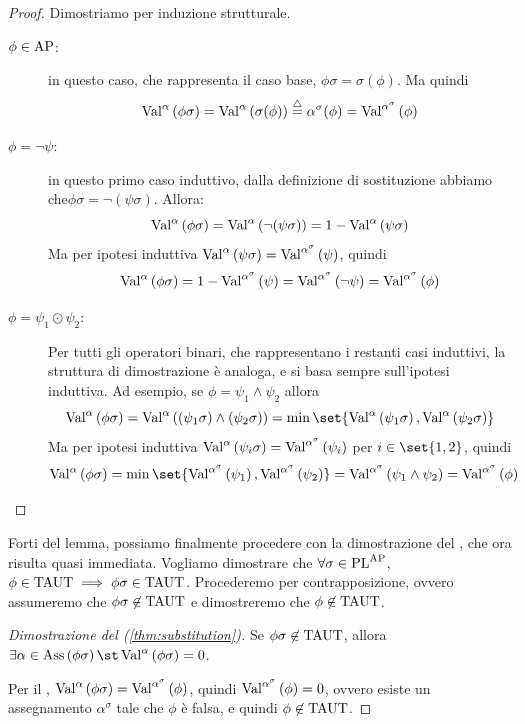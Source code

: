 \begin{proof}
  Dimostriamo per induzione strutturale.

  \begin{description}
    \item[\(\phi \in \AP\):] in questo caso, che rappresenta il caso base, \(\phi\sigma = \sigma(\phi)\). Ma quindi
      \[\Val{\alpha}[\phi\sigma] = \Val{\alpha}[\sigma(\phi)] \eqdef \alpha^\sigma(\phi) = \Val{\alpha^\sigma}[\phi]\]
    \item[\(\phi = \neg \psi\):] in questo primo caso induttivo, dalla definizione di sostituzione abbiamo che\(\phi\sigma = \neg (\psi\sigma)\). Allora:
      \[\Val{\alpha}[\phi\sigma] = \Val{\alpha}[\neg (\psi\sigma)] = 1 - \Val{\alpha}[\psi\sigma]\]
      Ma per ipotesi induttiva \(\Val{\alpha}[\psi\sigma] = \Val{\alpha^\sigma}[\psi]\), quindi
      \[\Val{\alpha}[\phi\sigma] = 1 - \Val{\alpha^\sigma}[\psi] = \Val{\alpha^\sigma}[\neg \psi] = \Val{\alpha^\sigma}[\phi]\]
    \item[\(\phi = \psi_1 \odot \psi_2\):] Per tutti gli operatori binari, che rappresentano i restanti casi induttivi, la struttura di dimostrazione è analoga, e si basa sempre sull'ipotesi induttiva. Ad esempio, se \(\phi = \psi_1 \land \psi_2\) allora
      \[\Val{\alpha}[\phi\sigma] = \Val{\alpha}[(\psi_1\sigma) \land (\psi_2\sigma)] = \min\set{\Val{\alpha}[\psi_1\sigma], \Val{\alpha}[\psi_2\sigma]}\]
      Ma per ipotesi induttiva \(\Val{\alpha}[\psi_i\sigma] = \Val{\alpha^\sigma}[\psi_i]\) per \(i\in\set{1,2}\), quindi
      \[\Val{\alpha}[\phi\sigma] = \min\set{\Val{\alpha^\sigma}[\psi_1], \Val{\alpha^\sigma}[\psi_2]} = \Val{\alpha^\sigma}[\psi_1 \land \psi_2] = \Val{\alpha^\sigma}[\phi]\]
  \end{description}
\end{proof}

Forti del lemma, possiamo finalmente procedere con la dimostrazione del , che ora risulta quasi immediata.
Vogliamo dimostrare che \(\forall \sigma \in \PL^{\AP}\), \(\phi \in \Taut \implies \phi\sigma \in \Taut\).
Procederemo per contrapposizione, ovvero assumeremo che \(\phi\sigma \not\in \Taut\) e dimostreremo che \(\phi \not\in \Taut\).

\begin{proof}[Dimostrazione del (\ref{thm:substitution})]
  Se \(\phi\sigma \not\in \Taut\), allora \(\exists \alpha \in \Ass{\phi\sigma} \st \Val{\alpha}[\phi\sigma] = 0\).

  Per il , \(\Val{\alpha}[\phi\sigma] = \Val{\alpha^\sigma}[\phi]\), quindi \(\Val{\alpha^\sigma}[\phi] = 0\), ovvero esiste un assegnamento \(\alpha^\sigma\) tale che \(\phi\) è falsa, e quindi \(\phi \not\in \Taut\).
\end{proof}


